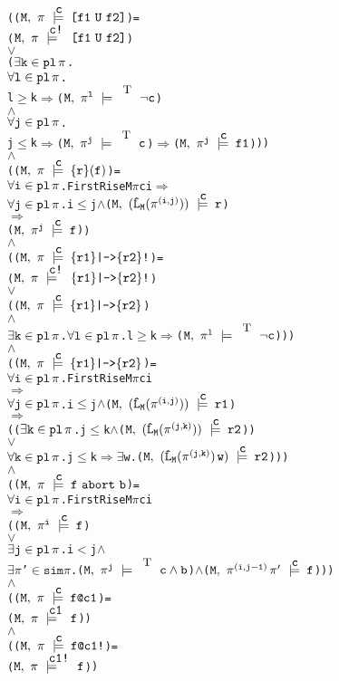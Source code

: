 \documentclass{llncs}
\makeatletter
\newcommand{\And}{\(\wedge\)}
\newcommand{\Or}{\(\vee\)}
\newcommand{\Imp}{\(\Rightarrow\)}
\newcommand{\Exists}{\(\exists\)}
\newcommand{\In}{\(\in\)}
\newcommand{\cat}{\hspace*{0.5mm}}
\newcommand{\pathCat}[2]{#1\hspace*{0.5mm}#2}
\newcommand{\Leq}{\(\leq\)}
\newcommand{\Geq}{\(\geq\)}
\newcommand{\Le}{\(<\)}
\newcommand{\T}{\texttt{\small\rm{T}}}
\renewcommand{\Pi}{\(\pi\)}
\newcommand{\SSem}[4]{(\(\tt{#1,~#2~\models^{\hspace*{-2.3mm}\raisebox{1mm}{\tt#3}}~#4}\))}
\newcommand{\FSem}[4]{(\(\tt{#1,~#2~\models^{\hspace*{-2.3mm}\raisebox{1mm}{\tt#3}}~#4}\))}
\newcommand{\pl}{\texttt{pl}\xspace}
\newcommand{\Sim}{\(\texttt{sim}\xspace\)}
\newcommand{\ResExists}[2]{\(\exists{\tt#1}\in\pl\hspace*{0.5mm}#2\)}
\newcommand{\ResForall}[2]{\(\forall{\tt#1}\in\pl\hspace*{0.5mm}#2\)}
\newcommand{\FBool}[1]{#1}
\newcommand{\bNot}[1]{\neg#1}
\newcommand{\weakClock}[1]{#1}
\newcommand{\strongClock}[1]{#1!}
\newcommand{\restN}[2]{#1^{#2}}
\newcommand{\pathSeg}[2]{#1^{#2}}
\newcommand{\lHat}[1]{\hat{\texttt{L}}_{#1}}
\newcommand{\bAnd}[2]{#1\wedge#2}
\newcommand{\fUntil}[2]{\texttt{[}#1~\texttt{U}~#2\texttt{]}}
\newcommand{\fSuffixImp}[2]{\{#1\}(#2)}
\newcommand{\fStrongImp}[2]{\{#1\}\texttt{|->}\{#2\}\texttt{!}}
\newcommand{\fWeakImp}[2]{\{#1\}\texttt{|->}\{#2\}}
\newcommand{\fAbort}[2]{#1~\texttt{abort}~#2}
\newcommand{\fWeakClock}[2]{#1\texttt{@}#2}
\newcommand{\fStrongClock}[2]{#1\texttt{@}#2\texttt{!}}
\makeatother
\begin{document}
{\begin{alltt}
    ({\FSem{M}{{\pi}}{{\weakClock{c}}}{\fUntil{f1}{f2}}} = 
      {\FSem{M}{{\pi}}{{\strongClock{c}}}{\fUntil{f1}{f2}}}  
       {\Or}
      ({\ResExists{k}{\pi}}.
        {\ResForall{l}{\pi}}.
          l {\Geq} k {\Imp} {\FSem{M}{\restN{{\pi}}{l}}{\weakClock{\T}}{{\FBool{\bNot{c}}}}}
                    {\And} 
                    {\ResForall{j}{\pi}}. 
                      j {\Leq} k {\Imp} {\FSem{M}{\restN{{\pi}}{j}}{\weakClock{\T}}{{\FBool{c}}}} {\Imp} {\FSem{M}{\restN{{\pi}}{j}}{{\weakClock{c}}}{f1}}))
    {\And}
    ({\FSem{M}{{\pi}}{{\weakClock{c}}}{\fSuffixImp{r}{f}}} = 
      {\ResForall{i}{\pi}}. FirstRise M {\Pi} c i {\Imp}
                {\ResForall{j}{\pi}}. i \Leq j \And \SSem{M}{(\lHat{M} (\pathSeg{\pi}{(i,j)}))}{c}{r}
                          {\Imp}
                          {\FSem{M}{\restN{{\pi}}{j}}{{\weakClock{c}}}{f}})
    {\And}
    ({\FSem{M}{{\pi}}{{\weakClock{c}}}{\fStrongImp{r1}{r2}}} = 
      {\FSem{M}{{\pi}}{{\strongClock{c}}}{\fStrongImp{r1}{r2}}}  
      {\Or}
      ({\FSem{M}{{\pi}}{{\weakClock{c}}}{\fWeakImp{r1}{r2}}} 
       {\And}
       {\ResExists{k}{\pi}}. {\ResForall{l}{\pi}}. l {\Geq} k {\Imp} {\FSem{M}{\restN{{\pi}}{l}}{\weakClock{\T}}{{\FBool{\bNot{c}}}}}))
    {\And}
    ({\FSem{M}{{\pi}}{{\weakClock{c}}}{\fWeakImp{r1}{r2}}} = 
      {\ResForall{i}{\pi}}.  FirstRise M {\Pi} c i
                 {\Imp}
                 {\ResForall{j}{\pi}}. i \Leq j \And \SSem{M}{(\lHat{M} (\pathSeg{\pi}{(i,j)}))}{c}{r1}
                           {\Imp}
                           (({\ResExists{k}{\pi}}. j \Leq k \And \SSem{M}{ (\lHat{M} (\pathSeg{\pi}{(j,k)}))}{c}{r2})
                            {\Or}
                            {\ResForall{k}{\pi}}. j \Leq k \Imp {\Exists}w. \SSem{M}{(\lHat{M} (\pathSeg{\pi}{(j,k)}){\cat}w)}{c}{r2}))
    {\And}
    ({\FSem{M}{{\pi}}{{\weakClock{c}}}{\fAbort{f}{b}}} =
      {\ResForall{i}{\pi}}. FirstRise M {\Pi} c i 
                {\Imp}
                ({\FSem{M}{\restN{{\pi}}{i}}{{\weakClock{c}}}{f}} 
                 {\Or}   
                 {\ResExists{j}{\pi}}. i \Le j \And
                  \Exists{\Pi}'\In\Sim {\Pi}. {\FSem{M}{\restN{{\pi}}{j}}{\weakClock{\T}}{{\FBool{\bAnd{c}{b}}}}} {\And} {\FSem{M}{\pathCat{\pathSeg{\pi}{(i,j-1)}}{{\pi}'}}{{\weakClock{c}}}{f}}))
    {\And}
    ({\FSem{M}{{\pi}}{{\weakClock{c}}}{\fWeakClock{f}{c1}}} =   
      {\FSem{M}{{\pi}}{{\weakClock{c1}}}{f}})
    {\And}
    ({\FSem{M}{{\pi}}{{\weakClock{c}}}{\fStrongClock{f}{c1}}} =   
      {\FSem{M}{{\pi}}{{\strongClock{c1}}}{f}})
\end{alltt}}
\end{document}
